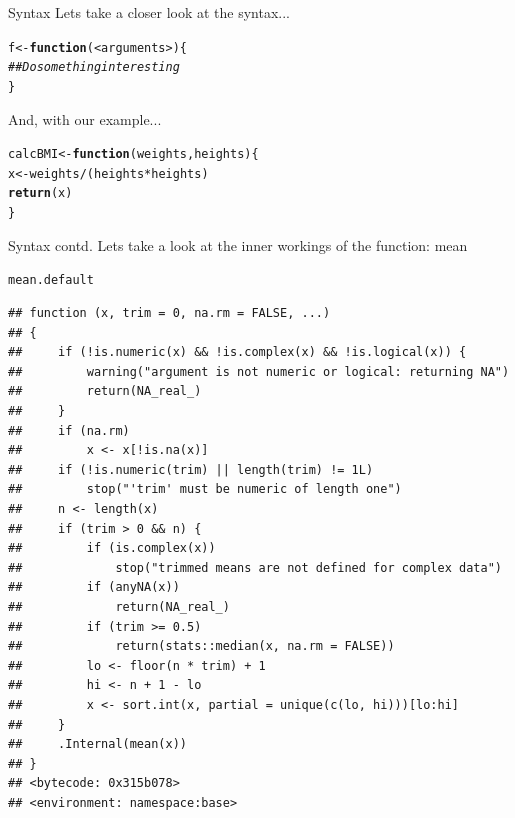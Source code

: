 \documentclass{beamer}\usepackage[]{graphicx}\usepackage[]{color}
\makeatletter
\newcommand{\hlcom}[1]{\textcolor[rgb]{0.678,0.584,0.686}{\textit{#1}}}%
\newcommand{\hlopt}[1]{\textcolor[rgb]{0,0,0}{#1}}%
\newcommand{\hlstd}[1]{\textcolor[rgb]{0.345,0.345,0.345}{#1}}%
\newcommand{\hlkwa}[1]{\textcolor[rgb]{0.161,0.373,0.58}{\textbf{#1}}}%
\newcommand{\hlkwb}[1]{\textcolor[rgb]{0.69,0.353,0.396}{#1}}%
\newcommand{\hlkwc}[1]{\textcolor[rgb]{0.333,0.667,0.333}{#1}}%
\newcommand{\hlkwd}[1]{\textcolor[rgb]{0.737,0.353,0.396}{\textbf{#1}}}%
\newenvironment{kframe}{%
 \def\at@end@of@kframe{}%
 \ifinner\ifhmode%
  \def\at@end@of@kframe{\end{minipage}}%
  \begin{minipage}{\columnwidth}%
 \fi\fi%
 \def\FrameCommand##1{\hskip\@totalleftmargin \hskip-\fboxsep
 \colorbox{shadecolor}{##1}\hskip-\fboxsep
     \hskip-\linewidth \hskip-\@totalleftmargin \hskip\columnwidth}%
 \MakeFramed {\advance\hsize-\width
   \@totalleftmargin\z@ \linewidth\hsize
   \@setminipage}}%
 {\par\unskip\endMakeFramed%
 \at@end@of@kframe}
\newenvironment{knitrout}{}{} %
\makeatother
\begin{document}
\begin{frame}[fragile]{Syntax}
Lets take a closer look at the syntax...
\begin{knitrout}
\color{fgcolor}\begin{kframe}
\begin{alltt}
f <- \hlkwd{function}(<arguments>) \{
\hlcom{## Do something interesting}
\}
\end{alltt}
\end{kframe}
\end{knitrout}
And, with our example...
\begin{knitrout}
\color{fgcolor}\begin{kframe}
\begin{alltt}
\hlstd{calcBMI} \hlkwb{<-} \hlkwa{function} \hlstd{(}\hlkwc{weights}\hlstd{,} \hlkwc{heights}\hlstd{) \{}
      \hlstd{x} \hlkwb{<-} \hlstd{weights} \hlopt{/} \hlstd{( heights} \hlopt{*} \hlstd{heights )}
      \hlkwd{return} \hlstd{(x)}
\hlstd{\}}
\end{alltt}
\end{kframe}
\end{knitrout}
\end{frame}

\begin{frame}[fragile]{Syntax contd.}
Lets take a look at the inner workings of the function: mean
\begin{knitrout}
\color{fgcolor}\begin{kframe}
\begin{alltt}
\hlstd{mean.default}
\end{alltt}
\begin{verbatim}
## function (x, trim = 0, na.rm = FALSE, ...) 
## {
##     if (!is.numeric(x) && !is.complex(x) && !is.logical(x)) {
##         warning("argument is not numeric or logical: returning NA")
##         return(NA_real_)
##     }
##     if (na.rm) 
##         x <- x[!is.na(x)]
##     if (!is.numeric(trim) || length(trim) != 1L) 
##         stop("'trim' must be numeric of length one")
##     n <- length(x)
##     if (trim > 0 && n) {
##         if (is.complex(x)) 
##             stop("trimmed means are not defined for complex data")
##         if (anyNA(x)) 
##             return(NA_real_)
##         if (trim >= 0.5) 
##             return(stats::median(x, na.rm = FALSE))
##         lo <- floor(n * trim) + 1
##         hi <- n + 1 - lo
##         x <- sort.int(x, partial = unique(c(lo, hi)))[lo:hi]
##     }
##     .Internal(mean(x))
## }
## <bytecode: 0x315b078>
## <environment: namespace:base>
\end{verbatim}
\end{kframe}
\end{knitrout}
\end{frame}
\end{document}

